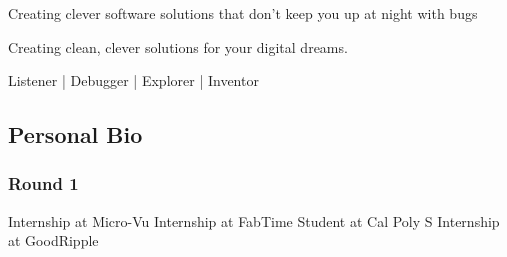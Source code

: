 Creating clever software solutions that don't keep you up at night with bugs

Creating clean, clever solutions for your digital dreams.

Listener | Debugger | Explorer | Inventor

\subsection{Personal Bio}

\subsubsection{Round 1}

\begin{outline}
    \1 Internship at Micro-Vu
        \2 
    \1 Internship at FabTime
    \1 Student at Cal Poly
        \2 S
    \1 Internship at GoodRipple
\end{outline}